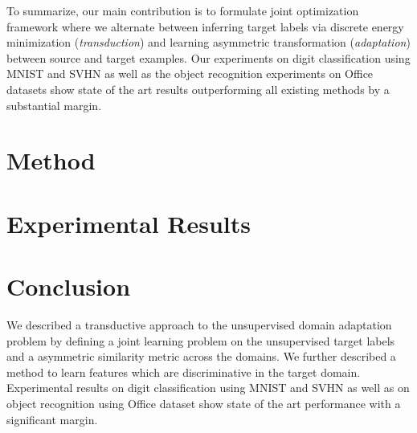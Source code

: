 \documentclass{article}
\begin{document}
To summarize, our main contribution is to formulate joint optimization framework where we alternate between inferring target labels via discrete energy minimization (\textit{transduction}) and learning asymmetric transformation (\textit{adaptation}) between source and target examples. Our experiments on digit classification using MNIST \cite{mnist} and SVHN\cite{svhn} as well as the object recognition experiments on Office \cite{office} datasets show state of the art results outperforming all existing methods by a substantial margin.


\section{Method} 



\section{Experimental Results}

\section{Conclusion} 
We described a transductive approach to the unsupervised domain adaptation problem by defining a joint learning problem on the unsupervised target labels and a asymmetric similarity metric across the domains. We further described a method to learn features which are discriminative in the target domain. Experimental results on digit classification using MNIST\cite{mnist} and SVHN\cite{svhn} as well as on object recognition using Office\cite{office} dataset show state of the art performance with a significant margin.



\clearpage


\end{document}
